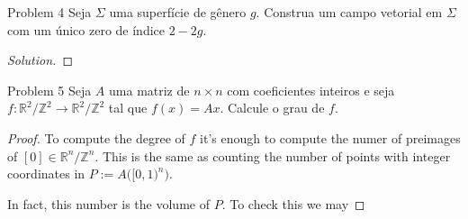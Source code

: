 \begin{thing1}{Problem 4}\label{prob:4}\leavevmode
Seja \(\Sigma\) uma superfície de gênero \(g\). Construa um campo vetorial em \(\Sigma\) com um único zero de índice \(2-2g\).
\end{thing1}

\begin{proof}[Solution]\leavevmode

\end{proof}

\begin{thing1}{Problem 5}\label{prob:5}\leavevmode
Seja \(A\) uma matriz de \(n \times n\) com coeficientes inteiros e seja \(f:\mathbb{R}^2/\mathbb{Z}^2 \to \mathbb{R}^2/\mathbb{Z}^2\) tal que \(f(x)=Ax\). Calcule o grau de \(f\).
\end{thing1}

\begin{proof}\leavevmode
	To compute the degree of \(f \) it's enough to compute the numer of preimages of \([0] \in \mathbb{R}^n/\mathbb{Z}^n\). This is the same as counting the number of points with integer coordinates in \(P:=A\Big( [0,1)^n \Big)\).

	In fact, this number is the volume of \(P\). To check this we may






\iffalse
	First consider the case for \(n=1\). Take the class \([0] \in \mathbb{R}/\mathbb{Z}\) and let's check how many preimages it has in the fundamental domain \([0,1) \subset \mathbb{R}\). Our matrix \(A\) is only a number, say \(a\). So we have \(ax \in [0]=\{0+n:n \in \mathbb{Z}\}\). This just says \(ax \in \mathbb{Z}\) which happens when \(x\) is a rational number with  denominator \(a\), and there's  \(|a|\) such numbers in \([0,1)\).

	Now for the case  \(n=2\) suppose \(A=\begin{pmatrix} a & b\\c & d \end{pmatrix} \), and let's look for points \(\vec{x}=(x,y) \in [0,1)^2\) such that \(A\vec{x} \in [\vec{0}]=\mathbb{Z}^2\). This means that
	\[A \vec{x}=\begin{pmatrix} a & b\\c & d \end{pmatrix} \begin{pmatrix} x\\y \end{pmatrix} =\begin{pmatrix} ax+by\\cx+dy \end{pmatrix} \in \mathbb{Z}^2.\]
	 Substracting these two conditions (that \(ax+by \in \mathbb{Z}\) and that \(cx+dy \in \mathbb{Z}\)) we obtain that
	 \[x(a-c) + y(b-d) \in \mathbb{Z}\]
	Suppose for a second that \(y=0\): we go back to a case similar to the 1-dimensional, namely there are \(|a-c|\) solutions. The same works whenever \(y(b-d) \in \mathbb{Z}\), for which there are \(|b-d|\) choices. So there's \(|a-c||b-d|\) solutions.
\fi
\end{proof}


